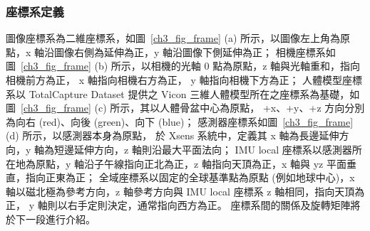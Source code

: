 \subsubsection{座標系定義}
圖像座標系為二維座標系，如圖~\ref{ch3_fig_frame} (a) 所示，以圖像左上角為原點，x 軸沿圖像右側為延伸為正，y 軸沿圖像下側延伸為正；
相機座標系如圖~\ref{ch3_fig_frame} (b) 所示，以相機的光軸 0 點為原點，z 軸與光軸重和，指向相機前方為正， x 軸指向相機右方為正， y 軸指向相機下方為正；
人體模型座標系以 TotalCapture Dataset 提供之 Vicon 三維人體模型所在之座標系為基礎，如圖~\ref{ch3_fig_frame} (c) 所示，其以人體骨盆中心為原點， +x、+y、+z 方向分別為向右 (red)、向後 (green)、向下 (blue)；
感測器座標系如圖~\ref{ch3_fig_frame} (d) 所示，以感測器本身為原點，
於 Xsens 系統中，定義其 x 軸為長邊延伸方向，y 軸為短邊延伸方向，z 軸則沿最大平面法向；
IMU local 座標系以感測器所在地為原點，y 軸沿子午線指向正北為正，z 軸指向天頂為正，x 軸與 yz 平面垂直，指向正東為正；
全域座標系以固定的全球基準點為原點 (例如地球中心)，x 軸以磁北極為參考方向，z 軸參考方向與 IMU local 座標系 z 軸相同，指向天頂為正，
y 軸則以右手定則決定，通常指向西方為正。
座標系間的關係及旋轉矩陣將於下一段進行介紹。

